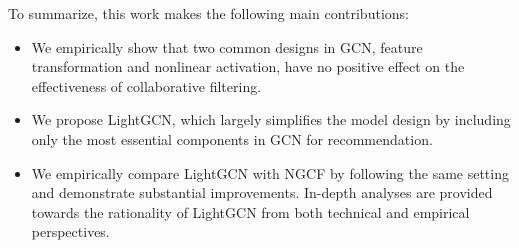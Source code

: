 To summarize, this work makes the following main contributions:
\begin{itemize}%
    \item We empirically show that two common designs in GCN, feature transformation and nonlinear activation, have no positive effect on the effectiveness of collaborative filtering. 
    \item We propose LightGCN, which largely simplifies the model design by including only the most essential components in GCN for recommendation.
    \item We empirically compare LightGCN with NGCF by following the same setting and demonstrate substantial improvements. In-depth analyses are provided towards the rationality of LightGCN from both technical and empirical perspectives. 
\end{itemize}

